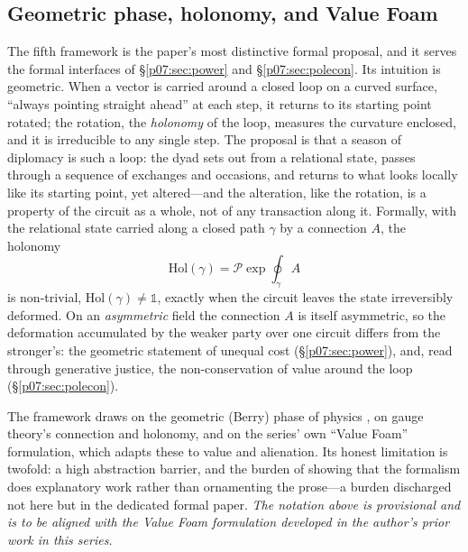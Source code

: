 \documentclass[11pt,a4paper]{article}
\newcommand{\xref}[1]{\textcolor{rose}{\S\ref{#1}}}
\begin{document}
\subsection{Geometric phase, holonomy, and Value Foam}
The fifth framework is the paper's most distinctive formal proposal, and it serves the formal interfaces of \xref{p07:sec:power} and \xref{p07:sec:polecon}. Its intuition is geometric. When a vector is carried around a closed loop on a curved surface, ``always pointing straight ahead'' at each step, it returns to its starting point rotated; the rotation, the \emph{holonomy} of the loop, measures the curvature enclosed, and it is irreducible to any single step. The proposal is that a season of diplomacy is such a loop: the dyad sets out from a relational state, passes through a sequence of exchanges and occasions, and returns to what looks locally like its starting point, yet altered---and the alteration, like the rotation, is a property of the circuit as a whole, not of any transaction along it. Formally, with the relational state carried along a closed path $\gamma$ by a connection $A$, the holonomy
\[
  \mathrm{Hol}(\gamma)=\mathcal{P}\exp\!\oint_{\gamma} A
\]
is non-trivial, $\mathrm{Hol}(\gamma)\neq\mathbb{1}$, exactly when the circuit leaves the state irreversibly deformed. On an \emph{asymmetric} field the connection $A$ is itself asymmetric, so the deformation accumulated by the weaker party over one circuit differs from the stronger's: the geometric statement of unequal cost (\xref{p07:sec:power}), and, read through generative justice, the non-conservation of value around the loop (\xref{p07:sec:polecon}).

The framework draws on the geometric (Berry) phase of physics \parencite{berry1984,simon1983}, on gauge theory's connection and holonomy, and on the series' own ``Value Foam'' formulation, which adapts these to value and alienation. Its honest limitation is twofold: a high abstraction barrier, and the burden of showing that the formalism does explanatory work rather than ornamenting the prose---a burden discharged not here but in the dedicated formal paper. \emph{The notation above is provisional and is to be aligned with the Value Foam formulation developed in the author's prior work in this series.}
\end{document}
